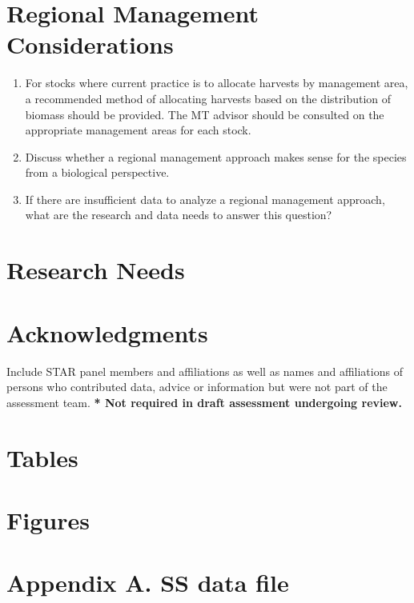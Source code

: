 \documentclass[12pt,]{article}
\begin{document}
\section{Regional Management
Considerations}\label{regional-management-considerations}

\begin{enumerate}
\def\labelenumi{\arabic{enumi}.}
\item
  For stocks where current practice is to allocate harvests by
  management area, a recommended method of allocating harvests based on
  the distribution of biomass should be provided. The MT advisor should
  be consulted on the appropriate management areas for each stock.
\item
  Discuss whether a regional management approach makes sense for the
  species from a biological perspective.
\item
  If there are insufficient data to analyze a regional management
  approach, what are the research and data needs to answer this
  question?
\end{enumerate}

\section{Research Needs}\label{research-needs}

\section{Acknowledgments}\label{acknowledgments}

Include STAR panel members and affiliations as well as names and
affiliations of persons who contributed data, advice or information but
were not part of the assessment team.
\textbf{* Not required in draft assessment undergoing review.}

\section{Tables}\label{tables}

\section{Figures}\label{figures}

\newpage

\section*{Appendix A. SS data file}\label{appendix-a.-ss-data-file}
\end{document}
